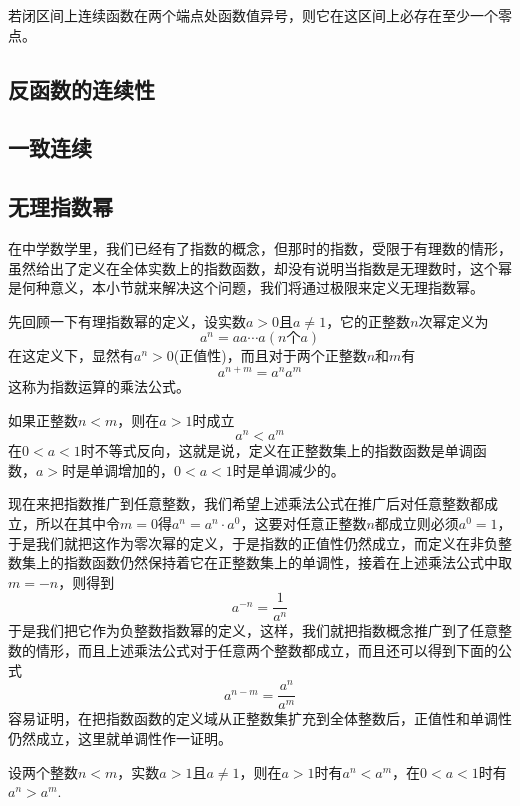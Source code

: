 \begin{inference}[零点定理]
  若闭区间上连续函数在两个端点处函数值异号，则它在这区间上必存在至少一个零点。
\end{inference}

\subsection{反函数的连续性}
\label{sec:continuousness-of-reverse-function}

\subsection{一致连续}
\label{sec:uniform-continuity}


\subsection{无理指数幂}
\label{sec:irrational-power}

在中学数学里，我们已经有了指数的概念，但那时的指数，受限于有理数的情形，虽然给出了定义在全体实数上的指数函数，却没有说明当指数是无理数时，这个幂是何种意义，本小节就来解决这个问题，我们将通过极限来定义无理指数幂。

先回顾一下有理指数幂的定义，设实数$a>0$且$a \neq 1$，它的正整数$n$次幂定义为
\[ a^n = aa\cdots a(n\text{个}a) \]
在这定义下，显然有$a^n>0$(正值性)，而且对于两个正整数$n$和$m$有
\begin{equation}
  \label{eq:exponent-multiple-rule-with-positive-integer}
  a^{n+m}=a^na^m
\end{equation}
这称为指数运算的乘法公式。

如果正整数$n<m$，则在$a>1$时成立
\[ a^n<a^m \]
在$0<a<1$时不等式反向，这就是说，定义在正整数集上的指数函数是单调函数，$a>$时是单调增加的，$0<a<1$时是单调减少的。

现在来把指数推广到任意整数，我们希望上述乘法公式在推广后对任意整数都成立，所以在其中令$m=0$得$a^n=a^n \cdot a^0$，这要对任意正整数$n$都成立则必须$a^0=1$，于是我们就把这作为零次幂的定义，于是指数的正值性仍然成立，而定义在非负整数集上的指数函数仍然保持着它在正整数集上的单调性，接着在上述乘法公式中取$m=-n$，则得到
\[ a^{-n} = \frac{1}{a^n} \]
于是我们把它作为负整数指数幂的定义，这样，我们就把指数概念推广到了任意整数的情形，而且上述乘法公式对于任意两个整数都成立，而且还可以得到下面的公式
\[ a^{n-m} = \frac{a^n}{a^m} \]
容易证明，在把指数函数的定义域从正整数集扩充到全体整数后，正值性和单调性仍然成立，这里就单调性作一证明。
\begin{theorem}
  设两个整数$n<m$，实数$a>1$且$a \neq 1$，则在$a>1$时有$a^n<a^m$，在$0<a<1$时有$a^n>a^m$.
\end{theorem}

